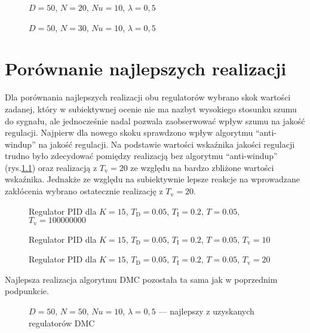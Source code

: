 \begin{figure}[H]
\centering

\caption{$ D = 50 $, $  N = 20 $, $ Nu = 10 $, $ \lambda = 0,5 $}
\label{DMC7}
\end{figure}

\begin{figure}[H]
\centering

\caption{$ D = 50 $, $  N = 30 $, $ Nu = 10 $, $ \lambda = 0,5 $}
\label{DMC8}
\end{figure}

\chapter{Porównanie najlepszych realizacji}
Dla porównania najlepszych realizacji obu regulatorów wybrano skok wartości zadanej, który w subiektywnej ocenie nie ma nazbyt wysokiego stosunku szumu do sygnału, ale jednocześnie nadal pozwala zaobserwować wpływ szumu na jakość regulacji. Najpierw dla nowego skoku sprawdzono wpływ algorytmu ``anti-windup'' na jakość regulacji. Na podstawie wartości wskaźnika jakości regulacji trudno było zdecydować pomiędzy realizacją bez algorytmu ``anti-windup'' (rys.\ref{PID1}) oraz realizacją z $T_\mathrm{v}=20$ ze względu na bardzo zbliżone wartości wskaźnika. Jednakże ze względu na subiektywnie lepsze reakcje na wprowadzane zakłócenia wybrano ostatecznie realizację z $T_\mathrm{v}=20$.

\begin{figure}[H]
\centering

\caption{Regulator PID dla $K = 15$, $T_\mathrm{D} = 0.05$, $T_\mathrm{I} = 0.2$, $T = 0.05$, $T_\mathrm{v} = 100000000$}
\label{PID1}
\end{figure}

\begin{figure}[H]
\centering

\caption{Regulator PID dla $K = 15$, $T_\mathrm{D} = 0.05$, $T_\mathrm{I} = 0.2$, $T = 0.05$, $T_\mathrm{v} = 10$}
\label{PID2}
\end{figure}

\begin{figure}[H]
\centering

\caption{Regulator PID dla $K = 15$, $T_\mathrm{D} = 0.05$, $T_\mathrm{I} = 0.2$, $T = 0.05$, $T_\mathrm{v} = 20$}
\label{PID3}
\end{figure}

Najlepsza realizacja algorytmu DMC pozostała ta sama jak w poprzednim podpunkcie.

\begin{figure}[H]
\centering

\caption{$ D = 50 $, $  N = 50 $, $ Nu = 10 $, $ \lambda = 0,5 $ --- najlepszy z uzyskanych regulatorów DMC}
\label{DMC6_2}
\end{figure}

